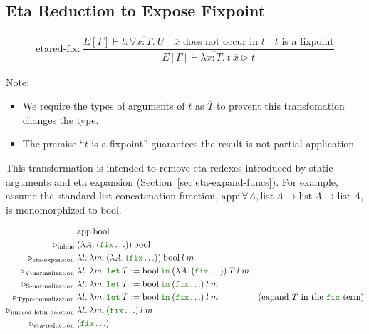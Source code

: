 \documentclass[a4paper,fleqn]{article}
\newcommand{\kwlet}{\mbox{\color{mygreen}\ttfamily let}}
\newcommand{\kwin}{\mbox{\color{mygreen}\ttfamily in}}
\newcommand{\kwfix}{\mbox{\color{mygreen}\ttfamily fix}}
\newcommand{\lam}[2]{\lambda #1.\:#2}
\newcommand{\letin}[3]{\kwlet\:#1:=#2\:\kwin\:#3}
\newcommand{\secref}[1]{Section~\ref{#1}}
\newcommand{\reltri}{\mathrel{\triangleright}}
\begin{document}
\subsection{Eta Reduction to Expose Fixpoint}\label{sec:eta-reduction}

\begin{gather*}
  \text{etared-fix:}~
    \dfrac{
      E[\Gamma] \vdash t : \forall \overline{x{:}T}.\: U \quad
      \text{$\overline{x}$ does not occur in $t$} \quad
      \text{$t$ is a fixpoint}
    }{E[\Gamma] \vdash \lam{\overline{x{:}T}}{t\: \overline{x}}
                       \reltri
                       t
    }
\end{gather*}
{\small Note:
\begin{itemize}
  \item We require the types of arguments of $t$ as $\overline{T}$ to prevent this transfomation changes the type.
  \item The premise ``$t$ is a fixpoint'' guarantees the result is not partial application.
\end{itemize}}

This transformation is intended to remove eta-redexes introduced by static arguments and eta expansion (\secref{sec:eta-expand-funcs}).
For example, assume the standard list concatenation function,
$\textrm{app}: \forall A, \textrm{list}\:A \rightarrow \textrm{list}\:A \rightarrow \textrm{list}\:A$,
is monomorphized to $\textrm{bool}$.

\begin{align*}
  & \textrm{app}\:\textrm{bool} \\
  \reltri_\textrm{inline}\; & (\lam{A}{(\kwfix \ldots)})\:\textrm{bool} \\
  \reltri_\textrm{eta-expansion}\; & \lam{l}{\lam{m}{(\lam{A}{(\kwfix \ldots)})\:\textrm{bool}\:l\:m}} \\
  \reltri_\textrm{V-normalization}\; & \lam{l}{\lam{m}{\letin{T}{\textrm{bool}}{(\lam{A}{(\kwfix \ldots)})\:T\:l\:m}}} \\
  \reltri_\textrm{S-normalization}\; & \lam{l}{\lam{m}{\letin{T}{\textrm{bool}}{(\kwfix \ldots)\:l\:m}}} \\
  \reltri_\textrm{Type-nomalization}\; & \lam{l}{\lam{m}{\letin{T}{\textrm{bool}}{(\kwfix \ldots)\:l\:m}}} & \textrm{(expand $T$ in the \kwfix-term)} \\
  \reltri_\textrm{unused-letin-deletion}\; & \lam{l}{\lam{m}{(\kwfix \ldots)\:l\:m}} \\
  \reltri_\textrm{eta-reduction}\; & (\kwfix \ldots) \\
\end{align*}
\end{document}
